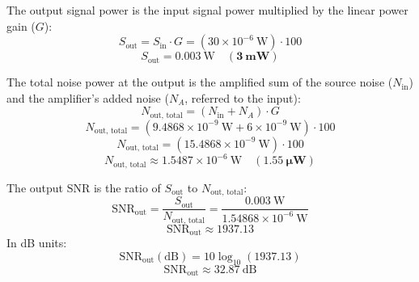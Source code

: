 \begin{solutionblock}
The output signal power is the input signal power multiplied by the linear power gain ($G$):
\[
S_{\text{out}} = S_{\text{in}} \cdot G = (30 \times 10^{-6} \ \text{W}) \cdot 100
\]
\[
S_{\text{out}} = 0.003 \ \text{W} \quad (\mathbf{3 \ \text{mW}})
\]
\end{solutionblock}

\begin{solutionblock}
The total noise power at the output is the amplified sum of the source noise ($N_{\text{in}}$) and the amplifier's added noise ($N_A$, referred to the input):
\[
N_{\text{out, total}} = (N_{\text{in}} + N_A) \cdot G
\]
\[
N_{\text{out, total}} = (9.4868 \times 10^{-9} \ \text{W} + 6 \times 10^{-9} \ \text{W}) \cdot 100
\]
\[
N_{\text{out, total}} = (15.4868 \times 10^{-9} \ \text{W}) \cdot 100
\]
\[
N_{\text{out, total}} \approx 1.5487 \times 10^{-6} \ \text{W} \quad (\mathbf{1.55 \ \mu\text{W}})
\]
\end{solutionblock}

\begin{solutionblock}

The output $\text{SNR}$ is the ratio of $S_{\text{out}}$ to $N_{\text{out, total}}$:
\[
\text{SNR}_{\text{out}} = \frac{S_{\text{out}}}{N_{\text{out, total}}} = \frac{0.003 \ \text{W}}{1.54868 \times 10^{-6} \ \text{W}}
\]
\[
\text{SNR}_{\text{out}} \approx 1937.13
\]
In dB units:
\[
\text{SNR}_{\text{out}} (\text{dB}) = 10 \log_{10}(1937.13)
\]
\[
\text{SNR}_{\text{out}} \approx 32.87 \ \text{dB}
\]
\end{solutionblock}
